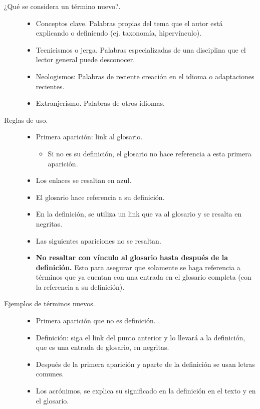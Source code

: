     \begin{description}
        \item[¿Qué se considera un término nuevo?.]\hfil
        \begin{itemize}
            \item Conceptos clave. Palabras propias del tema que el autor está explicando o definiendo (ej. taxonomía, hipervínculo).
            \item Tecnicismos o jerga. Palabras especializadas de una disciplina que el lector general puede desconocer.
            \item Neologismos: Palabras de reciente creación en el idioma o adaptaciones recientes.
            \item Extranjerismo. Palabras de otros idiomas.
        \end{itemize}
        \item[Reglas de uso.] \hfil
        \begin{itemize}
            \item Primera aparición:  link al glosario.
            \begin{itemize}
                \item Si no es su definición, el glosario no hace referencia a esta primera aparición.
            \end{itemize}
            \item Los enlaces se resaltan en azul.      
            \item El glosario hace referencia a su definición.    
            \item En la definición, se utiliza un link que va al glosario y se resalta en negritas.
            \item Las siguientes apariciones no se resaltan.              
            \item \textbf{No resaltar con vínculo al glosario hasta después de la definición.} Esto para asegurar que solamente se haga referencia a términos que ya cuentan con una entrada en el glosario completa (con la referencia a su definición).
        \end{itemize}        
        \item[Ejemplos de términos nuevos.]\hfil
        \begin{itemize}
            \item Primera aparición que no es definición. .
            \item Definición: siga el link del punto anterior y lo llevará a la definición, que es una entrada de glosario, en negritas.
            \item Después de la primera aparición y aparte de la definición se usan letras comunes.
            \item Los acrónimos, se explica su significado en la definición en el texto y en el glosario.            
        \end{itemize}
    \end{description}
    
